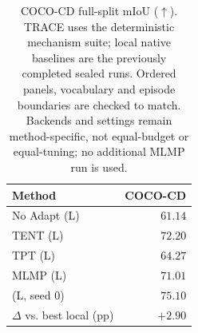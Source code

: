 \begin{table}[t]
\caption{COCO-CD full-split mIoU ($\uparrow$). TRACE uses the deterministic mechanism suite; local native baselines are the previously completed sealed runs. Ordered panels, vocabulary and episode boundaries are checked to match. Backends and settings remain method-specific, not equal-budget or equal-tuning; no additional MLMP run is used.}
\label{tab:cd-local}
\centering\small
\begin{tabular}{@{}lr@{}}
\toprule
Method & COCO-CD \\
\midrule
No Adapt (L) & $61.14$ \\
TENT (L) & $72.20$ \\
TPT (L) & $64.27$ \\
MLMP (L) & $71.01$ \\
\midrule
\method{} (L, seed 0) & $\mathbf{75.10}$ \\
$\Delta$ vs. best local (pp) & $+2.90$ \\
\bottomrule
\end{tabular}
\end{table}
